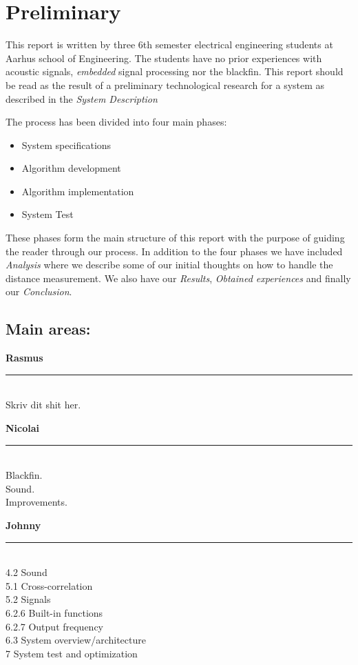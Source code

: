 \chapter{Preliminary}
This report is written by three 6th semester electrical engineering students at Aarhus school of Engineering. The students have no prior experiences with acoustic signals, \textit{embedded} signal processing nor the blackfin. This report should be read as the result of a preliminary technological research for a system as described in the \textit{System Description}

The process has been divided into four main phases:
\begin{itemize}
\item System specifications
\item Algorithm development
\item Algorithm implementation
\item System Test
\end{itemize}

These phases form the main structure of this report with the purpose of guiding the reader through our process. In addition to the four phases we have included \textit{Analysis} where we describe some of our initial thoughts on how to handle the distance measurement. We also have our \textit{Results}, \textit{Obtained experiences} and finally our \textit{Conclusion}.

\section{Main areas:}
\begin{minipage}{0.31\columnwidth}
\begin{center}
\textbf{Rasmus}
\end{center}
\hrule
\ \\
Skriv dit shit her.
\end{minipage}
\hfill
\vline
\hfill
\begin{minipage}{0.31\columnwidth}
\begin{center}
\textbf{Nicolai}
\end{center}
\hrule
\ \\
Blackfin.\\
Sound.\\
Improvements.\\
\end{minipage}
\hfill
\vline
\hfill
\begin{minipage}{0.31\columnwidth}
\begin{center}
\textbf{Johnny}
\end{center}
\hrule
\ \\
4.2 Sound\\
5.1 Cross-correlation\\
5.2 Signals\\
6.2.6 Built-in functions\\
6.2.7 Output frequency\\
6.3 System overview/architecture\\
7 System test and optimization

\end{minipage}